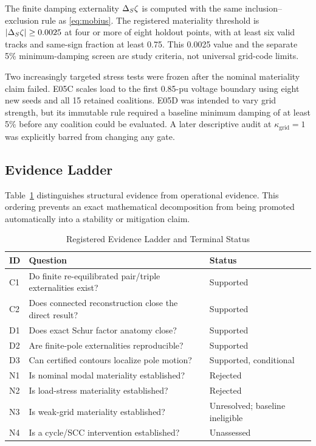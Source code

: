 The finite damping externality $\Delta_{S}\zeta$ is computed with the same
inclusion--exclusion rule as \eqref{eq:mobius}. The registered materiality
threshold is $|\Delta_{S}\zeta|\ge 0.0025$ at four or more of eight holdout
points, with at least six valid tracks and same-sign fraction at least 0.75.
This 0.0025 value and the separate 5\% minimum-damping screen are study
criteria, not universal grid-code limits.

Two increasingly targeted stress tests were frozen after the nominal
materiality claim failed. E05C scales load to the first 0.85-pu voltage
boundary using eight new seeds and all 15 retained coalitions. E05D was
intended to vary grid strength, but its immutable rule required a baseline
minimum damping of at least 5\% before any coalition could be evaluated. A
later descriptive audit at $\kappa_{\mathrm{grid}}=1$ was explicitly barred
from changing any gate.

\subsection{Evidence Ladder}

Table~\ref{tab:evidence} distinguishes structural evidence from operational
evidence. This ordering prevents an exact mathematical decomposition from
being promoted automatically into a stability or mitigation claim.

\begin{table}[t]
\caption{Registered Evidence Ladder and Terminal Status}
\label{tab:evidence}
\centering
\footnotesize
\begin{tabular}{p{}p{}p{}}
\toprule
ID & Question & Status\\
\midrule
C1 & Do finite re-equilibrated pair/triple externalities exist? & Supported\\
C2 & Does connected reconstruction close the direct result? & Supported\\
D1 & Does exact Schur factor anatomy close? & Supported\\
D2 & Are finite-pole externalities reproducible? & Supported\\
D3 & Can certified contours localize pole motion? & Supported, conditional\\
N1 & Is nominal modal materiality established? & Rejected\\
N2 & Is load-stress materiality established? & Rejected\\
N3 & Is weak-grid materiality established? & Unresolved; baseline ineligible\\
N4 & Is a cycle/SCC intervention established? & Unassessed\\
\bottomrule
\end{tabular}
\end{table}
